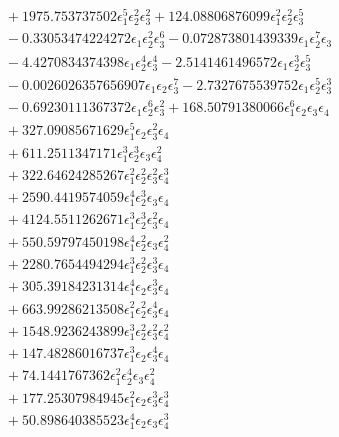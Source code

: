 \documentclass[10pt]{article}
\begin{document}
\begin{align*}
&{}  + 1975.753737502 \epsilon_{1}^{5} \epsilon_{2}^{2} \epsilon_{3}^{2} + 124.08806876099 \epsilon_{1}^{2} \epsilon_{2}^{2} \epsilon_{3}^{5} \\
&{}  - 0.33053474224272 \epsilon_{1} \epsilon_{2}^{2} \epsilon_{3}^{6} - 0.072873801439339 \epsilon_{1} \epsilon_{2}^{7} \epsilon_{3} \\
&{}  - 4.4270834374398 \epsilon_{1} \epsilon_{2}^{4} \epsilon_{3}^{4} - 2.5141461496572 \epsilon_{1} \epsilon_{2}^{3} \epsilon_{3}^{5} \\
&{}  - 0.0026026357656907 \epsilon_{1} \epsilon_{2} \epsilon_{3}^{7} - 2.7327675539752 \epsilon_{1} \epsilon_{2}^{5} \epsilon_{3}^{3} \\
&{}  - 0.69230111367372 \epsilon_{1} \epsilon_{2}^{6} \epsilon_{3}^{2} + 168.50791380066 \epsilon_{1}^{6} \epsilon_{2} \epsilon_{3} \epsilon_{4} \\
&{}  + 327.09085671629 \epsilon_{1}^{5} \epsilon_{2} \epsilon_{3}^{2} \epsilon_{4} \\
&{}  + 611.2511347171 \epsilon_{1}^{3} \epsilon_{2}^{3} \epsilon_{3} \epsilon_{4}^{2} \\
&{}  + 322.64624285267 \epsilon_{1}^{2} \epsilon_{2}^{2} \epsilon_{3}^{2} \epsilon_{4}^{3} \\
&{}  + 2590.4419574059 \epsilon_{1}^{4} \epsilon_{2}^{3} \epsilon_{3} \epsilon_{4} \\
&{}  + 4124.5511262671 \epsilon_{1}^{3} \epsilon_{2}^{3} \epsilon_{3}^{2} \epsilon_{4} \\
&{}  + 550.59797450198 \epsilon_{1}^{4} \epsilon_{2}^{2} \epsilon_{3} \epsilon_{4}^{2} \\
&{}  + 2280.7654494294 \epsilon_{1}^{3} \epsilon_{2}^{2} \epsilon_{3}^{3} \epsilon_{4} \\
&{}  + 305.39184231314 \epsilon_{1}^{4} \epsilon_{2} \epsilon_{3}^{3} \epsilon_{4} \\
&{}  + 663.99286213508 \epsilon_{1}^{2} \epsilon_{2}^{2} \epsilon_{3}^{4} \epsilon_{4} \\
&{}  + 1548.9236243899 \epsilon_{1}^{3} \epsilon_{2}^{2} \epsilon_{3}^{2} \epsilon_{4}^{2} \\
&{}  + 147.48286016737 \epsilon_{1}^{3} \epsilon_{2} \epsilon_{3}^{4} \epsilon_{4} \\
&{}  + 74.1441767362 \epsilon_{1}^{2} \epsilon_{2}^{4} \epsilon_{3} \epsilon_{4}^{2} \\
&{}  + 177.25307984945 \epsilon_{1}^{2} \epsilon_{2} \epsilon_{3}^{3} \epsilon_{4}^{3} \\
&{}  + 50.898640385523 \epsilon_{1}^{4} \epsilon_{2} \epsilon_{3} \epsilon_{4}^{3} \\

\end{align*}
\end{document}
